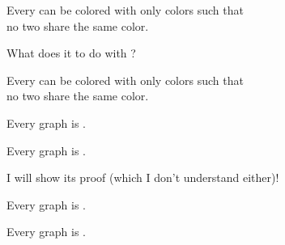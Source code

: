 \begin{frame}{}
  \begin{theorem}
    Every  can be colored with only  colors such that \\
    no two   share the same color.
  \end{theorem}

  \pause
  \vspace{0.50cm}
  \begin{center}
    What does it to do with ?
  \end{center}
\end{frame}

\begin{frame}{}
  \begin{theorem}
    Every  can be colored with only  colors such that \\
    no two   share the same color.
  \end{theorem}

  \pause

  \pause
  \begin{theorem}
    Every   graph is .
  \end{theorem}
\end{frame}

\begin{frame}{}
  \begin{theorem}
    Every   graph is .
  \end{theorem}

  \pause
  \vspace{0.30cm}
  \begin{center}
    I will  show its proof (which I don't understand either)!
  \end{center}

\end{frame}

\begin{frame}{}
  \begin{theorem}
    Every   graph is .
  \end{theorem}

  \pause
  \vspace{1.00cm}
  \begin{theorem}
    Every   graph is .
  \end{theorem}
\end{frame}
